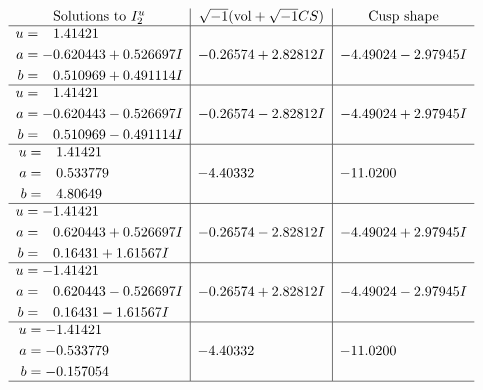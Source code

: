 \documentclass[1p]{elsarticle_modified}
\theoremstyle{definition}
\newcommand{\I}{\sqrt{-1}}
\begin{document}
$$\begin{array}{c|c|c}  
\text{Solutions to }I^u_{2}& \I (\text{vol} + \sqrt{-1}CS) & \text{Cusp shape}\\
 \hline 
\begin{aligned}
u &= \phantom{-}1.41421\phantom{ +0.000000I} \\
a &= -0.620443 + 0.526697 I \\
b &= \phantom{-}0.510969 + 0.491114 I\end{aligned}
 & -0.26574 + 2.82812 I & -4.49024 - 2.97945 I \\ \hline\begin{aligned}
u &= \phantom{-}1.41421\phantom{ +0.000000I} \\
a &= -0.620443 - 0.526697 I \\
b &= \phantom{-}0.510969 - 0.491114 I\end{aligned}
 & -0.26574 - 2.82812 I & -4.49024 + 2.97945 I \\ \hline\begin{aligned}
u &= \phantom{-}1.41421\phantom{ +0.000000I} \\
a &= \phantom{-}0.533779\phantom{ +0.000000I} \\
b &= \phantom{-}4.80649\phantom{ +0.000000I}\end{aligned}
 & -4.40332\phantom{ +0.000000I} & -11.0200\phantom{ +0.000000I} \\ \hline\begin{aligned}
u &= -1.41421\phantom{ +0.000000I} \\
a &= \phantom{-}0.620443 + 0.526697 I \\
b &= \phantom{-}0.16431 + 1.61567 I\end{aligned}
 & -0.26574 - 2.82812 I & -4.49024 + 2.97945 I \\ \hline\begin{aligned}
u &= -1.41421\phantom{ +0.000000I} \\
a &= \phantom{-}0.620443 - 0.526697 I \\
b &= \phantom{-}0.16431 - 1.61567 I\end{aligned}
 & -0.26574 + 2.82812 I & -4.49024 - 2.97945 I \\ \hline\begin{aligned}
u &= -1.41421\phantom{ +0.000000I} \\
a &= -0.533779\phantom{ +0.000000I} \\
b &= -0.157054\phantom{ +0.000000I}\end{aligned}
 & -4.40332\phantom{ +0.000000I} & -11.0200\phantom{ +0.000000I}\\
 \hline 
 \end{array}$$\newpage\newpage\renewcommand{\arraystretch}{1}
\end{document}
